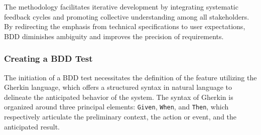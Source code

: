 The methodology facilitates iterative development by integrating systematic feedback cycles and promoting collective understanding among all stakeholders. By redirecting the emphasis from technical specifications to user expectations, \ac{BDD} diminishes ambiguity and improves the precision of requirements.

\subsubsection{Creating a BDD Test}

The initiation of a \ac{BDD} test necessitates the definition of the feature utilizing the Gherkin language, which offers a structured syntax in natural language to delineate the anticipated behavior of the system. The syntax of Gherkin is organized around three principal elements: \texttt{Given}, \texttt{When}, and \texttt{Then}, which respectively articulate the preliminary context, the action or event, and the anticipated result.

